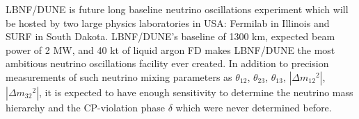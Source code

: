 






LBNF/DUNE is future long baseline neutrino oscillations experiment which will be hosted by two large physics laboratories in USA: Fermilab in Illinois and SURF in South Dakota. LBNF/DUNE's baseline of 1300 km, expected beam power of 2 MW, and 40 kt of liquid argon FD makes LBNF/DUNE the most ambitious neutrino oscillations facility ever created. In addition to precision measurements of such neutrino mixing parameters as $\theta_{12}$, $\theta_{23}$, $\theta_{13}$, $|\Delta{m_{12}}^2|$, $|\Delta{m_{32}}^2|$, it is expected to have enough sensitivity to determine the neutrino mass hierarchy and the CP-violation phase $\delta$ which were never determined before.\\

